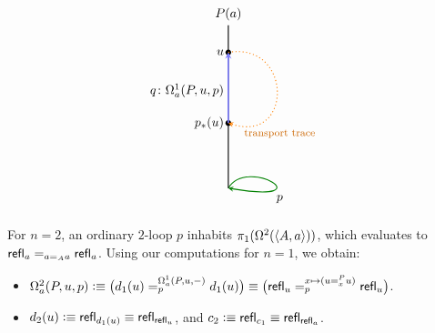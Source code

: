 \begin{xmpl}
\[\begin{tikzpicture}[scale=1.5]
            \draw[thick, green!50!black, ->, >=stealth] (0,-0.5) .. controls (0.35,0.1) and (1.8,-0.8) .. (0,-0.5);
            \node at (0.95,-0.7) {$p$};
    
            \draw[thick] (0,-0.5) -- (0,2.5) node[above] {$P(a)$};
    
            \fill (0, 2.0) circle (1.5pt) node[left] {$u$};
            \fill (0, 0.7) circle (1.5pt) node[left] {$p_*(u)$};
    
            \draw[thick, orange, ->, >=stealth,dotted] (0,2.0) .. controls (1.2,2.2) and (1.2,0.3) .. (0,0.7);
            \node[orange!80!black] at (0.95, 0.5) {\footnotesize transport trace};
    
            \draw[very thick, blue!50!white, ->, >=stealth] (0, 0.7) -- (0, 2.0);
            \node[left] at (0, 1.3) {$q\colon\Omega^1_a(P,u,p)$};
        \end{tikzpicture}
    \]
    
    For $n=2$, an ordinary $2$-loop $p$ inhabits $\pi_1(\Omega^2(\langle A,a\rangle))$, which evaluates to $\mathsf{refl}_a\mathrel{=_{a\mathrel{=_{A}}a}}\mathsf{refl}_a$. Using our computations for $n=1$, we obtain:
    \begin{itemize}
        \item $\Omega^2_a(P,u,p)\mathrel{\vcentcolon}\equiv\bigl(d_1(u)=_{p}^{\Omega^1_a(P,u,{\mathord-})}d_1(u)\bigr)\equiv\bigl(\mathsf{refl}_u=_{p}^{x\mapsto(u=_{x}^{P}u)}\mathsf{refl}_u\bigr)$.

        \item $d_2(u)\mathrel{\vcentcolon}\equiv\mathsf{refl}_{d_1(u)}\equiv\mathsf{refl}_{\mathsf{refl}_u}$, and $c_2\mathrel{\vcentcolon}\equiv\mathsf{refl}_{c_1}\equiv\mathsf{refl}_{\mathsf{refl}_a}$.


\end{itemize}
\end{xmpl}
